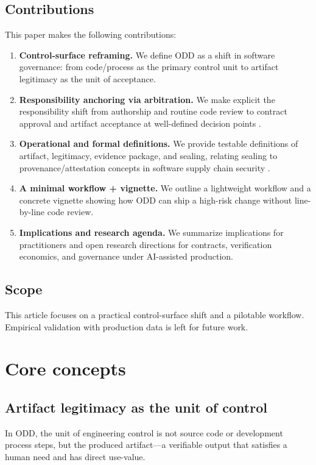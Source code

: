 \documentclass[conference]{IEEEtran}
\begin{document}
\subsection{Contributions}
This paper makes the following contributions:
\begin{enumerate}
\item \textbf{Control-surface reframing.} We define ODD as a shift in software governance: from code/process as the primary control unit to artifact legitimacy as the unit of acceptance.
\item \textbf{Responsibility anchoring via arbitration.} We make explicit the responsibility shift from authorship and routine code review to contract approval and artifact acceptance at well-defined decision points \cite{bacchelli2013codereview}.
\item \textbf{Operational and formal definitions.} We provide testable definitions of artifact, legitimacy, evidence package, and sealing, relating sealing to provenance/attestation concepts in software supply chain security \cite{torresarias2019intoto, openssf2023slsa, newman2022sigstore}.
\item \textbf{A minimal workflow + vignette.} We outline a lightweight workflow and a concrete vignette showing how ODD can ship a high-risk change without line-by-line code review.
\item \textbf{Implications and research agenda.} We summarize implications for practitioners and open research directions for contracts, verification economics, and governance under AI-assisted production.
\end{enumerate}

\subsection{Scope}
This article focuses on a practical control-surface shift and a pilotable workflow. Empirical validation with production data is left for future work.

\section{Core concepts}\label{sec:core-concepts}
\subsection{Artifact legitimacy as the unit of control}
In ODD, the unit of engineering control is not source code or development process steps, but the produced artifact---a verifiable output that satisfies a human need and has direct use-value.
\end{document}

